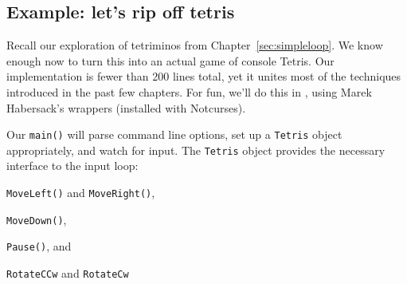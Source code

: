 \subsection{Example: let's rip off tetris}
\label{sec:casestudy}
Recall our exploration of tetriminos from Chapter~\ref{sec:simpleloop}. We
know enough now to turn this into an actual game of console Tetris. Our
implementation is fewer than 200 lines total, yet it unites most of the
techniques introduced in the past few chapters. For fun, we'll do this in \CC,
using Marek Habersack's \CC wrappers (installed with Notcurses).

Our \texttt{main()} will parse command line options, set up a \texttt{Tetris}
object appropriately, and watch for input. The \texttt{Tetris} object provides
the necessary interface to the input loop:

\begin{denseitemize}
\item{\texttt{MoveLeft()} and \texttt{MoveRight()}},
\item{\texttt{MoveDown()}},
\item{\texttt{Pause()}}, and
\item{\texttt{RotateCCw} and \texttt{RotateCw}}
\end{denseitemize}

